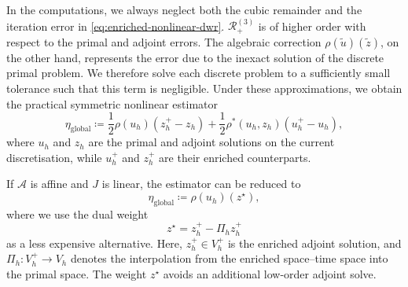 In the computations, we always neglect both the cubic remainder and the iteration error in \eqref{eq:enriched-nonlinear-dwr}. \(\mathcal R_+^{(3)}\) is of higher order with respect to the primal and adjoint errors. The algebraic correction  \(\rho(\tilde{u})(\tilde{z})\), on the other hand, represents the error due to the inexact solution of the discrete primal problem. We therefore solve each discrete problem to a sufficiently small tolerance such that this term is negligible. Under these approximations, we obtain the practical symmetric nonlinear estimator
\begin{equation}
\eta_{\mathrm{global}}
\coloneqq
\frac12\rho(u_h)(z_h^+-z_h)
+
\frac12\rho^\ast(u_h,z_h)(u_h^+-u_h),
\label{eq:practical-nonlinear-estimator}
\end{equation}
where \(u_h\) and \(z_h\) are the primal and adjoint solutions on the current discretisation, while \(u_h^+\) and \(z_h^+\) are their enriched counterparts.

If \(\mathcal A\) is affine and \(J\) is linear, the estimator can be reduced to
\begin{equation}
\eta_{\mathrm{global}}
\coloneqq
\rho(u_h)(z^\star),
\label{eq:computable-dwr-two-solves}
\end{equation}
where we use the dual weight
\begin{equation}
z^\star=z_h^+-\Pi_{h}z_h^+
\label{eq:computable-dwr-interpolated-weight}
\end{equation}
as a less expensive alternative. Here, \(z_h^+\in V_h^+\) is the enriched adjoint solution, and \(\Pi_{h}:V_{h}^{+}\rightarrow V_{h}\) denotes the interpolation from the enriched space--time space into the primal space. The weight \(z^\star\) avoids an additional low-order adjoint solve. 


